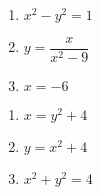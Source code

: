 \begin{multicols}{3}
\begin{enumerate}
\setcounter{enumi}{\value{HW}}

\item $x^{2} - y^{2} = 1$
\item $y = \dfrac{x}{x^{2} - 9}$
\item $x = -6$

\setcounter{HW}{\value{enumi}}
\end{enumerate}
\end{multicols}

\begin{multicols}{3}
\begin{enumerate}
\setcounter{enumi}{\value{HW}}

\item  $x = y^2 + 4$

\item $y = x^2 + 4$
\item $x^2 + y^2 = 4$ \label{equfunctionlast}

\setcounter{HW}{\value{enumi}}
\end{enumerate}
\end{multicols}

